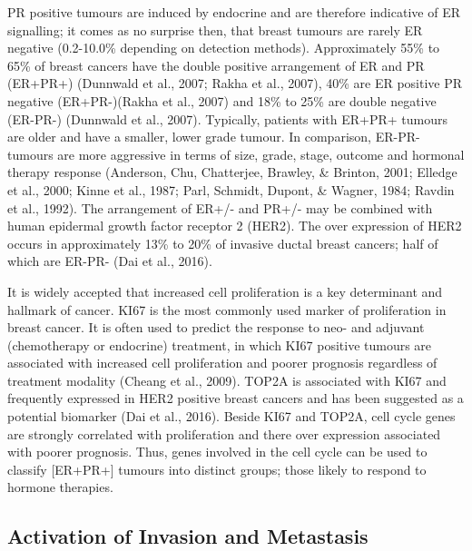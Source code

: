 \documentclass[a4paper, twoside]{templates/ociamthesis}
\begin{document}
PR positive tumours are induced by endocrine and are therefore indicative of ER signalling; it comes as no surprise then, that breast tumours are rarely ER negative (0.2-10.0\% depending on detection methods). Approximately 55\% to 65\% of breast cancers have the double positive arrangement of ER and PR (ER+PR+) (Dunnwald et al., 2007; Rakha et al., 2007), 40\% are ER positive PR negative (ER+PR-)(Rakha et al., 2007) and 18\% to 25\% are double negative (ER-PR-) (Dunnwald et al., 2007). Typically, patients with ER+PR+ tumours are older and have a smaller, lower grade tumour. In comparison, ER-PR- tumours are more aggressive in terms of size, grade, stage, outcome and hormonal therapy response (Anderson, Chu, Chatterjee, Brawley, \& Brinton, 2001; Elledge et al., 2000; Kinne et al., 1987; Parl, Schmidt, Dupont, \& Wagner, 1984; Ravdin et al., 1992). The arrangement of ER+/- and PR+/- may be combined with human epidermal growth factor receptor 2 (HER2). The over expression of HER2 occurs in approximately 13\% to 20\% of invasive ductal breast cancers; half of which are ER-PR- (Dai et al., 2016).

It is widely accepted that increased cell proliferation is a key determinant and hallmark of cancer. KI67 is the most commonly used marker of proliferation in breast cancer. It is often used to predict the response to neo- and adjuvant (chemotherapy or endocrine) treatment, in which KI67 positive tumours are associated with increased cell proliferation and poorer prognosis regardless of treatment modality (Cheang et al., 2009). TOP2A is associated with KI67 and frequently expressed in HER2 positive breast cancers and has been suggested as a potential biomarker (Dai et al., 2016). Beside KI67 and TOP2A, cell cycle genes are strongly correlated with proliferation and there over expression associated with poorer prognosis. Thus, genes involved in the cell cycle can be used to classify {[}ER+\textbar PR+{]} tumours into distinct groups; those likely to respond to hormone therapies.

\hypertarget{activation-of-invasion-and-metastasis}{%
\subsection{Activation of Invasion and Metastasis}\label{activation-of-invasion-and-metastasis}}
\end{document}
